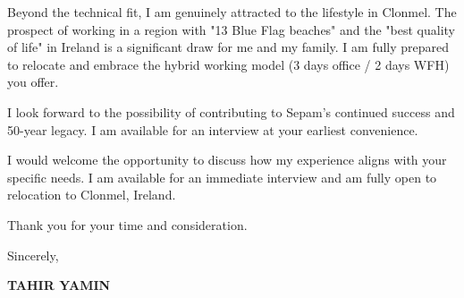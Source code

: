 \documentclass[11pt,a4paper]{article}
\begin{document}
Beyond the technical fit, I am genuinely attracted to the lifestyle in Clonmel. The prospect of working in a region with "13 Blue Flag beaches" and the "best quality of life" in Ireland is a significant draw for me and my family. I am fully prepared to relocate and embrace the hybrid working model (3 days office / 2 days WFH) you offer.

I look forward to the possibility of contributing to Sepam's continued success and 50-year legacy. I am available for an interview at your earliest convenience.

I would welcome the opportunity to discuss how my experience aligns with your specific needs. I am available for an immediate interview and am fully open to relocation to Clonmel, Ireland.

Thank you for your time and consideration.

\vspace{0.5cm}
Sincerely,

\vspace{0.5cm}
\textbf{TAHIR YAMIN}
\end{document}
